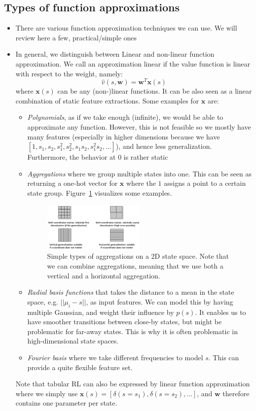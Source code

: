 \subsection{Types of function approximations}
\begin{itemize}
	\item There are various function approximation techniques we can use. We will review here a few, practical/simple ones
	\item In general, we distinguish between Linear and non-linear function approximation. We call an approximation linear if the value function is linear with respect to the weight, namely:
	$$\hat{v}(s,\bm{w})=\bm{w}^T\bm{x}(s)$$
	where $\bm{x}(s)$ can be any (non-)linear functions. It can be also seen as a linear combination of static feature extractions. Some examples for $\bm{x}$ are:
	\begin{itemize}
		\item \textit{Polynomials}, as if we take enough (infinite), we would be able to approximate any function. However, this is not feasible so we mostly have many features (especially in higher dimensions because we have $\left[1,s_1,s_2,s_1^2, s_2^2, s_1s_2, s_1^2s_2,...\right]$), and hence less generalization. Furthermore, the behavior at 0 is rather static
		\item \textit{Aggregations} where we group multiple states into one. This can be seen as returning a one-hot vector for $\bm{x}$ where the $1$ assigns a point to a certain state group. Figure~\ref{fig:rl_approximate_value_based_aggregation} visualizes some examples.
		\begin{figure}[ht!]
			\centering
			\includegraphics[width=0.5\textwidth]{figures/rl_approximate_value_based_aggregation.png}
			\caption{Simple types of aggregations on a 2D state space. Note that we can combine aggregations, meaning that we use both a vertical and a horizontal aggregation.}
			\label{fig:rl_approximate_value_based_aggregation}
		\end{figure}
		\item \textit{Radial basis functions} that takes the distance to a mean in the state space, e.g. $||\mu_i-s||$, as input features. We can model this by having multiple Gaussian, and weight their influence by $p(s)$. It enables us to have smoother transitions between close-by states, but might be problematic for far-away states. This is why it is often problematic in high-dimensional state spaces.
		\item \textit{Fourier basis} where we take different frequencies to model $s$. This can provide a quite flexible feature set.
	\end{itemize}
	Note that tabular RL can also be expressed by linear function approximation where we simply use $\bm{x}(s)=\left[\delta(s=s_1), \delta(s=s_2),...\right]$, and $\bm{w}$ therefore contains one parameter per state.
	

\end{itemize}
